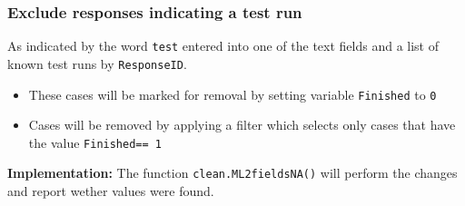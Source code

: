 \documentclass[]{article}
\begin{document}
\subsubsection{\textbf{Exclude} responses indicating a test
run}\label{exclude-responses-indicating-a-test-run}

As indicated by the word \texttt{test} entered into one of the text
fields and a list of known test runs by \texttt{ResponseID}.

\begin{itemize}
\itemsep1pt\parskip0pt
\item
  These cases will be marked for removal by setting variable
  \texttt{Finished} to \texttt{0}
\item
  Cases will be removed by applying a filter which selects only cases
  that have the value \texttt{Finished== 1}
\end{itemize}

\textbf{Implementation:} The function \texttt{clean.ML2fieldsNA()} will
perform the changes and report wether values were found.
\end{document}
